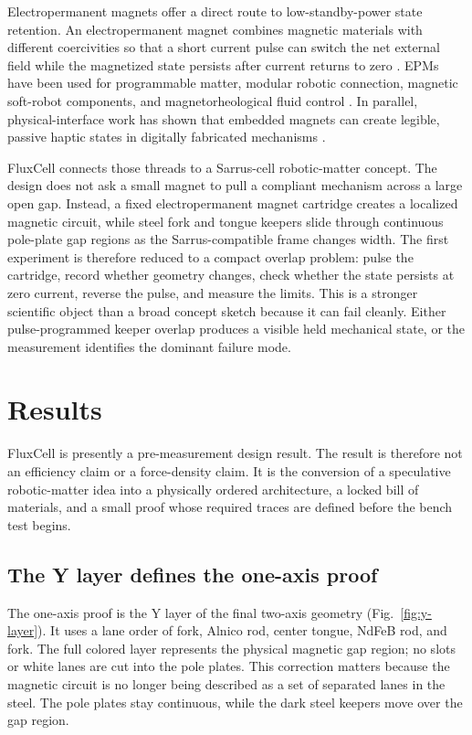 \documentclass[12pt,letterpaper]{article}
\newcommand{\fluxcell}{FluxCell}
\newcommand{\epm}{electropermanent magnet}
\begin{document}
Electropermanent magnets offer a direct route to low-standby-power state retention. An \epm{} combines magnetic materials with different coercivities so that a short current pulse can switch the net external field while the magnetized state persists after current returns to zero \cite{knaian2010,johnson2024,zhu2019}. EPMs have been used for programmable matter, modular robotic connection, magnetic soft-robot components, and magnetorheological fluid control \cite{knaian2010,zhu2019,johnson2024,ntella2023}. In parallel, physical-interface work has shown that embedded magnets can create legible, passive haptic states in digitally fabricated mechanisms \cite{zheng2019}.

\fluxcell{} connects those threads to a Sarrus-cell robotic-matter concept. The design does not ask a small magnet to pull a compliant mechanism across a large open gap. Instead, a fixed \epm{} cartridge creates a localized magnetic circuit, while steel fork and tongue keepers slide through continuous pole-plate gap regions as the Sarrus-compatible frame changes width. The first experiment is therefore reduced to a compact overlap problem: pulse the cartridge, record whether geometry changes, check whether the state persists at zero current, reverse the pulse, and measure the limits. This is a stronger scientific object than a broad concept sketch because it can fail cleanly. Either pulse-programmed keeper overlap produces a visible held mechanical state, or the measurement identifies the dominant failure mode.

\section{Results}

\fluxcell{} is presently a pre-measurement design result. The result is therefore not an efficiency claim or a force-density claim. It is the conversion of a speculative robotic-matter idea into a physically ordered architecture, a locked bill of materials, and a small proof whose required traces are defined before the bench test begins.

\subsection{The Y layer defines the one-axis proof}

The one-axis proof is the Y layer of the final two-axis geometry (Fig.~\ref{fig:y-layer}). It uses a lane order of fork, Alnico rod, center tongue, NdFeB rod, and fork. The full colored layer represents the physical magnetic gap region; no slots or white lanes are cut into the pole plates. This correction matters because the magnetic circuit is no longer being described as a set of separated lanes in the steel. The pole plates stay continuous, while the dark steel keepers move over the gap region.
\end{document}
